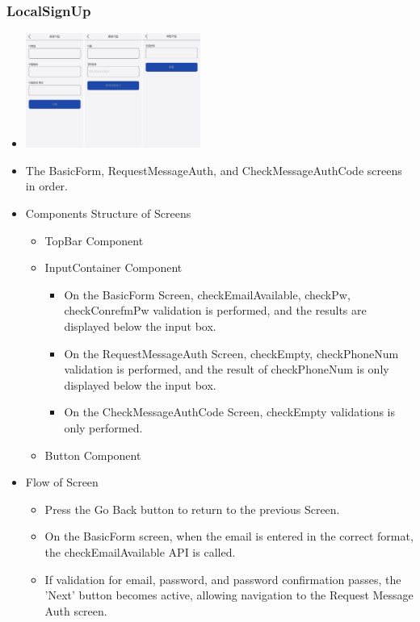 \documentclass[conference]{IEEEtran}
\begin{document}
\subsubsection{LocalSignUp}
\begin{itemize}
    \item[] \includegraphics[width=0.45\textwidth]{img/Screen/2_SignUp.png}
    \item The BasicForm, RequestMessageAuth, and CheckMessageAuthCode screens in order.
    \item Components Structure of Screens
    \begin{itemize}
        \item TopBar Component
        \item InputContainer Component
        \begin{itemize}
            \item On the BasicForm Screen, checkEmailAvailable, checkPw, checkConrefmPw validation is performed, and the results are displayed below the input box.
            \item On the RequestMessageAuth Screen, checkEmpty, checkPhoneNum validation is performed, and the result of checkPhoneNum is only displayed below the input box.
            \item On the CheckMessageAuthCode Screen, checkEmpty validations is only performed.
        \end{itemize}
        \item Button Component
    \end{itemize}
    \item Flow of Screen
    \begin{itemize}
        \item Press the Go Back button to return to the previous Screen.
        \item On the BasicForm screen, when the email is entered in the correct format, the checkEmailAvailable API is called.
        \item If validation for email, password, and password confirmation passes, the 'Next' button becomes active, allowing navigation to the Request Message Auth screen.

\end{itemize}
\end{itemize}
\end{document}
